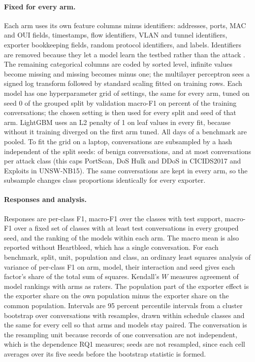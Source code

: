\documentclass[pdflatex,sn-mathphys-num]{sn-jnl}
\newcommand{\setnum}[1]{#1}
\newcommand{\cicids}{CICIDS2017}
\theoremstyle{thmstyleone}%
\theoremstyle{thmstylethree}%
\begin{document}
\paragraph{Fixed for every arm.} Each arm uses its own feature columns minus identifiers: addresses, ports, MAC and OUI fields, timestamps, flow identifiers, VLAN and tunnel identifiers, exporter bookkeeping fields, random protocol identifiers, and labels. Identifiers are removed because they let a model learn the testbed rather than the attack \cite{arp2022,flood2024}. The remaining categorical columns are coded by sorted level, infinite values become missing and missing becomes minus one; the multilayer perceptron sees a signed log transform followed by standard scaling fitted on training rows. Each model has one hyperparameter grid of \SetGridSize{} settings, the same for every arm, tuned on seed \setnum{0} of the grouped split by validation macro-F1 on \SetValPct{} percent of the training conversations; the chosen setting is then used for every split and seed of that arm. LightGBM uses an L2 penalty of \setnum{1} on leaf values in every fit, because without it training diverged on the first arm tuned. All days of a benchmark are pooled. To fit the grid on a laptop, conversations are subsampled by a hash independent of the split seeds: \SetBenignFraction{} of benign conversations, and at most \SetAttackCap{} conversations per attack class (this caps PortScan, DoS Hulk and DDoS in \cicids{} and Exploits in UNSW-NB15). The same conversations are kept in every arm, so the subsample changes class proportions identically for every exporter.

\paragraph{Responses and analysis.} Responses are per-class F1, macro-F1 over the classes with test support, macro-F1 over a fixed set of classes with at least \SetMinTest{} test conversations in every grouped seed, and the ranking of the models within each arm. The macro mean is also reported without Heartbleed, which has a single conversation. For each benchmark, split, unit, population and class, an ordinary least squares analysis of variance of per-class F1 on arm, model, their interaction and seed gives each factor's share of the total sum of squares. Kendall's $W$ \cite{kendall1939} measures agreement of model rankings with arms as raters. The population part of the exporter effect is the exporter share on the own population minus the exporter share on the common population. Intervals are \setnum{95} percent percentile intervals from a cluster bootstrap over conversations \cite{field2007} with \SetBoot{} resamples, drawn within schedule classes and the same for every cell so that arms and models stay paired. The conversation is the resampling unit because records of one conversation are not independent, which is the dependence RQ1 measures; seeds are not resampled, since each cell averages over its five seeds before the bootstrap statistic is formed.
\end{document}
